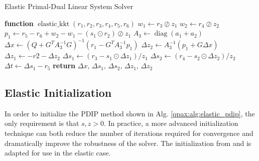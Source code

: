 %
%
\begin{algorithm}
\begin{algorithmic}[1]
    \caption{Elastic Primal-Dual Linear System Solver}\label{qpax:alg:elastic_kkt}
        \State \textbf{function} $\operatorname{elastic\_kkt}(r_1, r_2, r_3, r_4, r_5, r_6)$ 
        \State $w_1 \gets r_3 \oslash z_1$
        \State $w_2 \gets r_4 \oslash z_2$
        \State $p_1 \gets r_5 - r_6 + w_2 - w_1 - (s_1 \odot r_2) \oslash z_1$
        \State $A_3 \gets \operatorname{diag}(a_1 + a_2)$
        \State $\Delta x \gets (Q + G^TA_3^{-1}G)^{-1}(r_1 - G^TA_3^{-1}p_1) $ 
        \State  $\Delta z_2 \gets A_3^{-1}(p_1 + G \Delta x) $
        \State  $\Delta z_1 \gets -r2 - \Delta z_2 $
        \State  $\Delta s_1 \gets (r_3 - s_1 \odot \Delta z_1) / z_1  $
        \State  $\Delta s_2 \gets (r_4 - s_2 \odot \Delta z_2) / z_2 $
        \State  $\Delta t \gets \Delta s_1 - r_5 $
    \State \textbf{return} $\Delta x,\, \Delta s_1,\, \Delta s_2,\, \Delta z_1,\, \Delta z_2$
\end{algorithmic}
\end{algorithm}
%
\subsection{Elastic Initialization}\label{qpax:sec:elastic_init}
In order to initialize the PDIP method shown in Alg. \eqref{qpax:alg:elastic_pdip}, the only requirement is that $s,z > 0$. In practice, a more advanced initialization technique can both reduce the number of iterations required for convergence and dramatically improve the robustness of the solver. The initialization from \cite{vandenberghe} and \cite{mattingley2012} is adapted for use in the elastic case.

